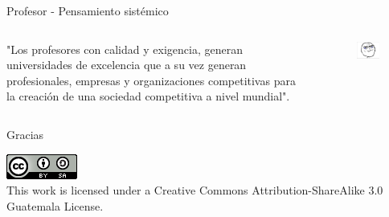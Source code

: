 \documentclass{beamer}
\begin{document}
\begin{frame}{Profesor - Pensamiento sistémico}
	
	\begin{columns}
		\begin{column}{0.5\textwidth}
			"Los profesores con calidad y exigencia, generan universidades de excelencia que a su vez generan profesionales, empresas y organizaciones competitivas para la creación de una sociedad competitiva a nivel mundial".
		\end{column}
		\begin{column}{0.5\textwidth}  %
			\begin{figure}
				\centering
				\includegraphics[width=0.9\linewidth]{img/proudmeme}	
			\end{figure}
		\end{column}
	\end{columns}
\end{frame}

\begin{frame}{Gracias}
	\begin{center}
		\includegraphics[width=0.1\linewidth]{img/cclogo}
		\\
		This work is licensed under a Creative Commons Attribution-ShareAlike 3.0 Guatemala License.
	\end{center}
\end{frame}
\end{document}
